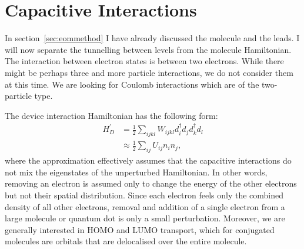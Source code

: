 \section{Capacitive Interactions} 
\label{sec:capacitive}
In section~\ref{sec:eommethod} I have already discussed the molecule and the leads. I will now separate the tunnelling between levels from the molecule Hamiltonian. The interaction between electron states is between two electrons. While there might be perhaps three and more particle interactions, we do not consider them at this time. We are looking for Coulomb interactions which are of the two-particle type.

The device interaction Hamiltonian has the following form:
\begin{align*}
H^\prime_D &= \frac{1}{2} \sum_{ijkl} W_{ijkl} d^\dagger_i d_j d^\dagger_k d_l \\
&\approx \frac{1}{2} \sum_{ij} U_{ij} n_i n_j,
\end{align*} where the approximation effectively assumes that the capacitive interactions do not mix the eigenstates of the unperturbed Hamiltonian. In other words, removing an electron is assumed only to change the energy of the other electrons but not their spatial distribution. Since each electron feels only the combined density of all other electrons, removal and addition of a single electron from a large molecule or quantum dot is only a small perturbation. Moreover, we are generally interested in HOMO and LUMO transport, which for conjugated molecules are orbitals that are delocalised over the entire molecule.

